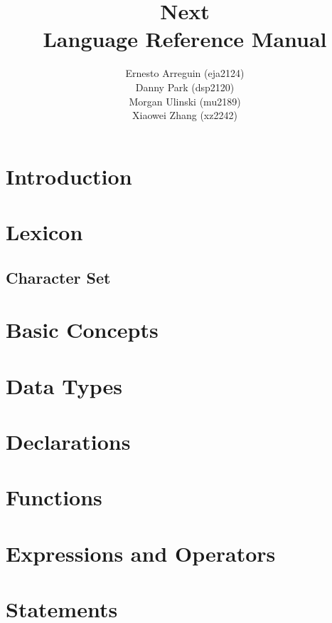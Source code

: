 \documentclass[12pt]{article}
\begin{document}
\title{\textbf{Next} \\ Language Reference Manual}
\author{Ernesto Arreguin (eja2124) \\Danny Park (dsp2120) \\Morgan Ulinski (mu2189) \\Xiaowei Zhang (xz2242)}
\date{}
\maketitle

\pagebreak

\tableofcontents

\section{Introduction}

\section{Lexicon}
\subsection{Character Set}

\section{Basic Concepts}
\section{Data Types}
\section{Declarations}
\section{Functions}
\section{Expressions and Operators}
\section{Statements}
\end{document}
